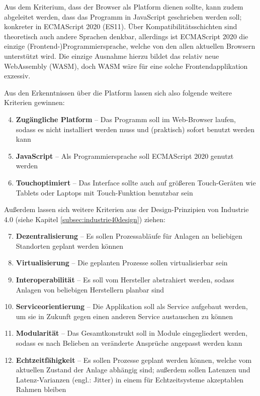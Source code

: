 Aus dem Kriterium, dass der Browser als Platform dienen sollte, kann zudem abgeleitet werden, dass das Programm in JavaScript geschrieben werden soll; konkreter in ECMAScript 2020 (ES11). Über Kompatibilitätsschichten sind theoretisch auch andere Sprachen denkbar, allerdings ist ECMAScript 2020 die einzige (Frontend-)Programmiersprache, welche von den allen aktuellen Browsern unterstützt wird. Die einzige Ausnahme hierzu bildet das relativ neue WebAssembly (WASM), doch WASM wäre für eine solche Frontendapplikation exzessiv.

Aus den Erkenntnissen über die Platform lassen sich also folgende weitere Kriterien gewinnen:

\begin{enumerate}
    \setcounter{enumi}{3}
    \item \textbf{Zugängliche Platform} – Das Programm soll im Web-Browser laufen, sodass es nicht installiert werden muss und (praktisch) sofort benutzt werden kann
    \item \textbf{JavaScript} – Als Programmiersprache soll ECMAScript 2020 genutzt werden
    \item \textbf{Touchoptimiert} – Das Interface sollte auch auf größeren Touch-Geräten wie Tablets oder Laptops mit Touch-Funktion benutzbar sein
\end{enumerate}

Außerdem lassen sich weitere Kriterien aus der Design-Prinzipien von Industrie 4.0 (siehe Kapitel \ref{subsec:industrie40design}) ziehen:

\begin{enumerate}
    \setcounter{enumi}{6}
    \item \textbf{Dezentralisierung} – Es sollen Prozessabläufe für Anlagen an beliebigen Standorten geplant werden können
    \item \textbf{Virtualisierung} – Die geplanten Prozesse sollen virtualisierbar sein
    \item \textbf{Interoperabilität} – Es soll vom Hersteller abstrahiert werden, sodass Anlagen von beliebigen Herstellern planbar sind
    \item \textbf{Serviceorientierung} – Die Applikation soll als Service aufgebaut werden, um sie in Zukunft gegen einen anderen Service austauschen zu können
    \item \textbf{Modularität} – Das Gesamtkonstrukt soll in Module eingegliedert werden, sodass es nach Belieben an veränderte Ansprüche angepasst werden kann
    \item \textbf{Echtzeitfähigkeit} – Es sollen Prozesse geplant werden können, welche vom aktuellen Zustand der Anlage abhängig sind; außerdem sollen Latenzen und Latenz-Varianzen (engl.: Jitter) in einem für Echtzeitsysteme akzeptablen Rahmen bleiben
\end{enumerate}
